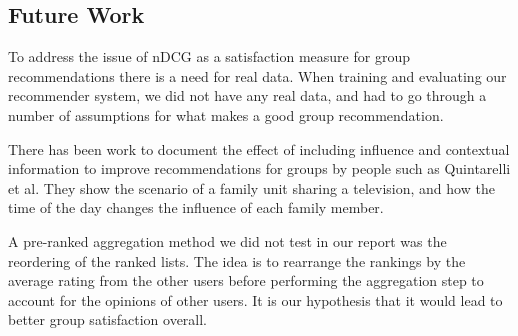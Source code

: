 \subsection{Future Work}\label{sec:futurework}

To address the issue of nDCG as a satisfaction measure for group recommendations there is a need for real data. When training and evaluating our recommender system, we did not have any real data, and had to go through a number of assumptions for what makes a good group recommendation.

There has been work to document the effect of including influence and contextual information to improve recommendations for groups by people such as Quintarelli et al\cite{Quintarelli2016}. They show the scenario of a family unit sharing a television, and how the time of the day changes the influence of each family member.



A pre-ranked aggregation method we did not test in our report was the reordering of the ranked lists.
The idea is to rearrange the rankings by the average rating from the other users before performing the aggregation step to account for the opinions of other users. It is our hypothesis that it would lead to better group satisfaction overall.